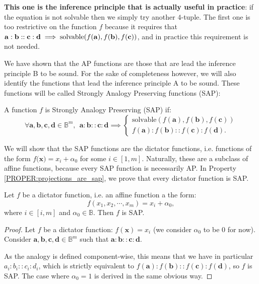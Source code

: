 \textbf{This one is the inference principle that is actually useful in
practice}: if the
equation is not solvable then we simply try another $4$-tuple. The first one is
too restrictive on the function $f$ because it requires that $\mathbf{a} :
\mathbf{b} :: \mathbf{c} : \mathbf{d} \implies  \text{solvable}(f(\mathbf{a}),
f(\mathbf{b}), f(\mathbf{c}))$, and in practice this requirement is not
needed.

We have shown that the AP functions are those that are lead the inference
principle B to be sound.  For the sake of completeness however, we will also
identify the functions that lead the inference principle A to be sound. These
functions will be called Strongly Analogy Preserving functions (SAP):

\begin{definition}
  A function $f$ is Strongly Analogy Preserving (SAP) if:
  $$\forall \mathbf{a}, \mathbf{b}, \mathbf{c}, \mathbf{d} \in \mathbb{B}^m, ~~
  \mathbf{a}: \mathbf{b}:: \mathbf{c}: \mathbf{d} \implies
  \begin{cases}
    \text{solvable}(f(\mathbf{a}), f(\mathbf{b}), f(\mathbf{c}))\\
     f(\mathbf{a}) : f(\mathbf{b}) :: f(\mathbf{c}) : f(\mathbf{d}).
  \end{cases}$$
\end{definition}

We will show that the SAP functions are the dictator functions, i.e. functions
of the form $f(\mathbf{x)} = x_i + \alpha_0$ for some $i \in [1, m]$.
Naturally, these are a subclass of affine functions, because every SAP function
is necessarily AP. In Property \ref{PROPER:projections_are_sap}, we prove that
every dictator function  is SAP.

\begin{property}
  \label{PROPER:projections_are_sap}
  Let $f$ be a dictator function, i.e. an affine function a the form:
  $$f(x_1, x_2, \cdots, x_m) = x_i + \alpha_0,$$
  where $i \in [i, m]$ and $\alpha_0 \in \mathbb{B}$. Then $f$ is SAP.
\end{property}
\begin{proof}
  Let $f$ be a dictator function: $f(\mathbf{x}) = x_i$ (we consider $\alpha_0$
  to be $0$ for now). Consider $\mathbf{a}, \mathbf{b}, \mathbf{c}, \mathbf{d}
  \in \mathbb{B}^m$ such that $\mathbf{a}: \mathbf{b}:: \mathbf{c}:
  \mathbf{d}$.

  As the analogy is defined component-wise, this means that we have in
  particular $a_i : b_i :: c_i : d_i$, which is strictly equivalent to
  $f(\mathbf{a}) : f(\mathbf{b}) :: f(\mathbf{c}) : f(\mathbf{d})$, so $f$ is
  SAP. The case where $\alpha_0 = 1$ is derived in the same obvious way.
\end{proof}

